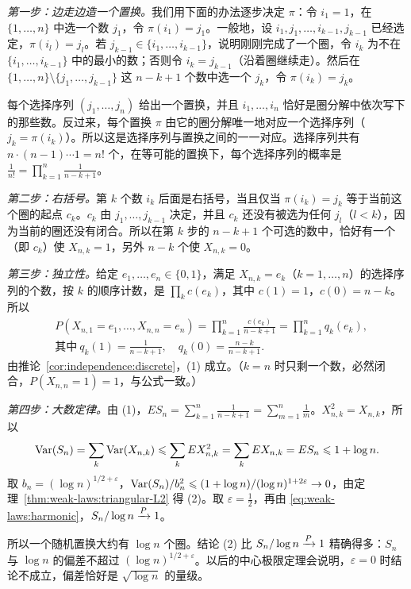 \begin{solution}
\emph{第一步：边走边造一个置换。}我们用下面的办法逐步决定 $\pi$：令 $i_1=1$，在 $\{1,\dots,n\}$ 中选一个数 $j_1$，令 $\pi(i_1)=j_1$。一般地，设 $i_1,j_1,\dots,i_{k-1},j_{k-1}$ 已经选定，$\pi(i_l)=j_l$。若 $j_{k-1}\in\{i_1,\dots,i_{k-1}\}$，说明刚刚完成了一个圈，令 $i_k$ 为不在 $\{i_1,\dots,i_{k-1}\}$ 中的最小的数；否则令 $i_k=j_{k-1}$（沿着圈继续走）。然后在 $\{1,\dots,n\}\setminus\{j_1,\dots,j_{k-1}\}$ 这 $n-k+1$ 个数中选一个 $j_k$，令 $\pi(i_k)=j_k$。

每个选择序列 $(j_1,\dots,j_n)$ 给出一个置换，并且 $i_1,\dots,i_n$ 恰好是圈分解中依次写下的那些数。反过来，每个置换 $\pi$ 由它的圈分解唯一地对应一个选择序列（$j_k=\pi(i_k)$）。所以这是选择序列与置换之间的一一对应。选择序列共有 $n\cdot(n-1)\cdots1=n!$ 个，在等可能的置换下，每个选择序列的概率是 $\frac1{n!}=\prod_{k=1}^n\frac1{n-k+1}$。

\emph{第二步：右括号。}第 $k$ 个数 $i_k$ 后面是右括号，当且仅当 $\pi(i_k)=j_k$ 等于当前这个圈的起点 $c_k$。$c_k$ 由 $j_1,\dots,j_{k-1}$ 决定，并且 $c_k$ 还没有被选为任何 $j_l$（$l<k$），因为当前的圈还没有闭合。所以在第 $k$ 步的 $n-k+1$ 个可选的数中，恰好有一个（即 $c_k$）使 $X_{n,k}=1$，另外 $n-k$ 个使 $X_{n,k}=0$。

\emph{第三步：独立性。}给定 $e_1,\dots,e_n\in\{0,1\}$，满足 $X_{n,k}=e_k$（$k=1,\dots,n$）的选择序列的个数，按 $k$ 的顺序计数，是 $\prod_k c(e_k)$，其中 $c(1)=1$，$c(0)=n-k$。所以
\[
\begin{aligned}
&P(X_{n,1}=e_1,\dots,X_{n,n}=e_n)=\prod_{k=1}^n\frac{c(e_k)}{n-k+1}=\prod_{k=1}^nq_k(e_k),\\
&\text{其中}\ q_k(1)=\frac1{n-k+1},\quad q_k(0)=\frac{n-k}{n-k+1}.
\end{aligned}
\]
由推论~\ref{cor:independence:discrete}，(1) 成立。（$k=n$ 时只剩一个数，必然闭合，$P(X_{n,n}=1)=1$，与公式一致。）

\emph{第四步：大数定律。}由 (1)，$ES_n=\sum_{k=1}^n\frac1{n-k+1}=\sum_{m=1}^n\frac1m$。$X_{n,k}^2=X_{n,k}$，所以
\[
\operatorname{Var}(S_n)=\sum_k\operatorname{Var}(X_{n,k})\leqslant\sum_kEX_{n,k}^2=\sum_kEX_{n,k}=ES_n\leqslant1+\log n .
\]
取 $b_n=(\log n)^{1/2+\varepsilon}$，$\operatorname{Var}(S_n)/b_n^2\leqslant(1+\log n)/(\log n)^{1+2\varepsilon}\to0$，由定理~\ref{thm:weak-laws:triangular-L2} 得 (2)。取 $\varepsilon=\frac12$，再由 \eqref{eq:weak-laws:harmonic}，$S_n/\log n\xrightarrow{P}1$。

所以一个随机置换大约有 $\log n$ 个圈。结论 (2) 比 $S_n/\log n\xrightarrow{P}1$ 精确得多：$S_n$ 与 $\log n$ 的偏差不超过 $(\log n)^{1/2+\varepsilon}$。以后的中心极限定理会说明，$\varepsilon=0$ 时结论不成立，偏差恰好是 $\sqrt{\log n}$ 的量级。
\end{solution}

